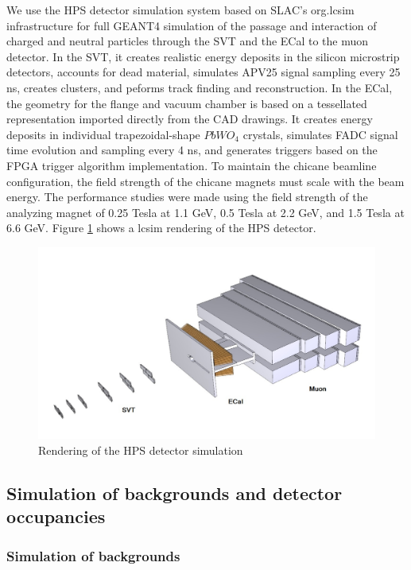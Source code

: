 \def\etal{{\it et al.\/}}


We use the HPS detector simulation system based on SLAC's org.lcsim infrastructure for full GEANT4
simulation of the passage and interaction of charged and neutral particles through the SVT 
and the ECal to the muon detector. In the SVT, it creates realistic energy deposits in the silicon 
microstrip detectors, accounts for dead material, simulates APV25 signal sampling every 25 ns, 
creates clusters, and peforms track finding and reconstruction.
In the ECal, the geometry for the flange and vacuum chamber is based on a tessellated 
representation imported directly from the CAD drawings. It creates energy deposits in individual 
trapezoidal-shape $PbWO_4$ crystals, simulates FADC signal time evolution and sampling every 4 ns, and 
generates triggers based on the  FPGA trigger algorithm implementation.
To maintain the chicane beamline configuration, the field strength of the
chicane magnets must scale with the beam energy. The performance studies were 
made using the field strength of the 
analyzing magnet of 0.25 Tesla at 1.1 GeV, 0.5 Tesla at 2.2 GeV, and 
1.5 Tesla at 6.6 GeV.
Figure  \ref{fig:lcsim} shows a lcsim rendering of the HPS detector.

\begin{figure}[h]
\includegraphics[width=\textwidth]{performance/lcsimDetector}
\caption{\small{ Rendering of the HPS detector simulation}}
\label{fig:lcsim}
\end{figure}

\subsection{Simulation of backgrounds and detector occupancies}

\subsubsection{Simulation of backgrounds}
\label{sec:backgrounds}

